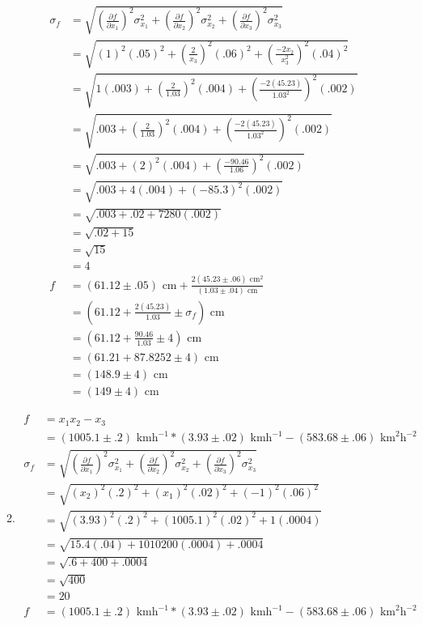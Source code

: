 \documentclass{article}
\begin{document}
\begin{enumerate}
\begin{enumerate}
\begin{align*}
\sigma_{f} &= \sqrt{(\frac{\partial f}{\partial x_1})^2\sigma_{x_1}^2 + (\frac{\partial f}{\partial x_2})^2\sigma_{x_2}^2 + (\frac{\partial f}{\partial x_3})^2\sigma_{x_3}^2}\\
&= \sqrt{(1)^2(.05)^2 + (\frac2{x_3})^2(.06)^2 + (\frac{-2x_2}{x_3^2})^2(.04)^2}\\
&= \sqrt{1(.003) + (\frac2{1.03})^2(.004) + (\frac{-2(45.23)}{1.03^2})^2(.002)}\\
&= \sqrt{.003 + (\frac2{1.03})^2(.004) + (\frac{-2(45.23)}{1.03^2})^2(.002)}\\
&= \sqrt{.003 + (2)^2(.004) + (\frac{-90.46}{1.06})^2(.002)}\\
&= \sqrt{.003 + 4(.004) + (-85.3)^2(.002)}\\
&= \sqrt{.003 + .02 + 7280(.002)}\\
&= \sqrt{.02 + 15}\\
&= \sqrt{15}\\
&= 4\\
f &= (61.12 \pm .05)\text{ cm} + \frac{2(45.23 \pm .06)\text{ cm}^2}{(1.03 \pm .04)\text{ cm}}\\
&= (61.12 + \frac{2(45.23)}{1.03} \pm \sigma_{f})\text{ cm}\\
&= (61.12 + \frac{90.46}{1.03} \pm 4)\text{ cm}\\
&= (61.21 + 87.8252 \pm 4)\text{ cm}\\
&= (148.9 \pm 4)\text{ cm}\\
&= (149 \pm 4)\text{ cm}
\end{align*}
\item
\begin{align*}
f &= x_1x_2 - x_3\\
&= (1005.1 \pm .2)\text{ kmh}^{-1} * (3.93 \pm .02)\text{ kmh}^{-1} - (583.68 \pm .06)\text{ km}^2\text{h}^{-2}\\
\sigma_{f} &= \sqrt{(\frac{\partial f}{\partial x_1})^2\sigma_{x_1}^2 + (\frac{\partial f}{\partial x_2})^2\sigma_{x_2}^2 + (\frac{\partial f}{\partial x_3})^2\sigma_{x_3}^2}\\
&= \sqrt{(x_2)^2(.2)^2 + (x_1)^2(.02)^2 + (-1)^2(.06)^2}\\
&= \sqrt{(3.93)^2(.2)^2 + (1005.1)^2(.02)^2 + 1(.0004)}\\
&= \sqrt{15.4(.04) + 1010200(.0004) + .0004}\\
&= \sqrt{.6 + 400 + .0004}\\
&= \sqrt{400}\\
&= 20\\
f &= (1005.1 \pm .2)\text{ kmh}^{-1} * (3.93 \pm .02)\text{ kmh}^{-1} - (583.68 \pm .06)\text{ km}^2\text{h}^{-2}\\

\end{align*}
\end{enumerate}
\end{enumerate}
\end{document}
